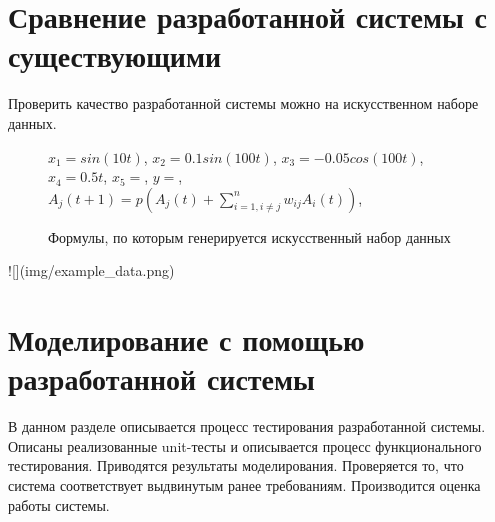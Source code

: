
\section{Сравнение разработанной системы с существующими}

Проверить качество разработанной системы можно на искусственном наборе
данных.

\def\figurename{Формула}
\begin{figure}[t]
	\centering
	$ x_1 = sin(10t) $,
	$ x_2 = 0.1 sin(100t) $,
	$ x_3 = -0.05 cos(100t) $,
	$ x_4 = 0.5 t $,
	$ x_5 =  $,
	$ y =  $,
	$ A_j(t+1) = p( A_j(t) + \sum_{i = 1, i \neq j}^{n} w_{ij} A_i(t) ) $,
	\caption{Формулы, по которым генерируется искусственный набор данных}
	\label{img:concepts_recalc}
\end{figure}
\noindent


![](img/example_data.png)

\section{Моделирование с помощью разработанной системы}
\begin{annotation}
	В данном разделе описывается процесс тестирования разработанной системы.
	Описаны реализованные unit-тесты и описывается процесс функционального тестирования.
	Приводятся результаты моделирования. Проверяется то, что система соответствует выдвинутым ранее требованиям.
	Производится оценка работы системы.
\end{annotation}

